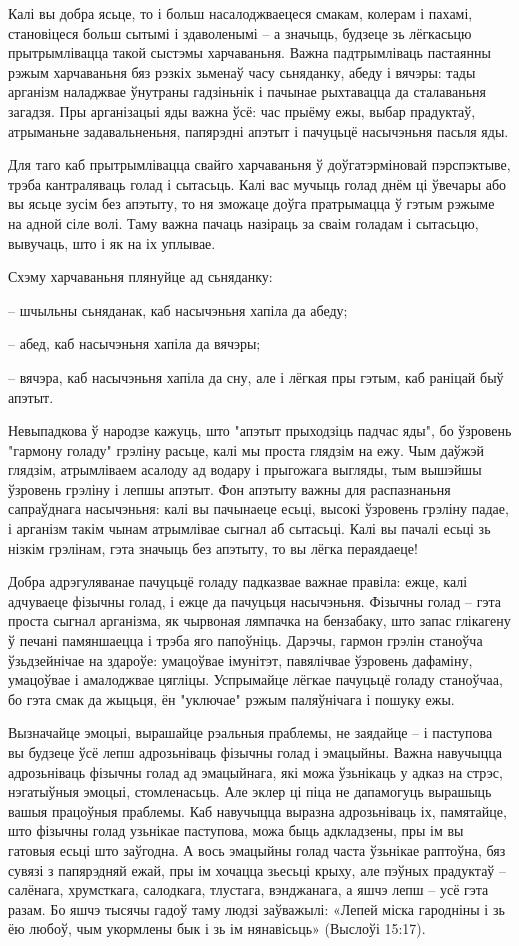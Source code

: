 Калі вы добра ясьце, то і больш насалоджваецеся смакам, колерам і пахамі, становіцеся больш сытымі і здаволенымі – а значыць, будзеце зь лёгкасьцю прытрымлівацца такой сыстэмы харчаваньня. Важна падтрымліваць пастаянны рэжым харчаваньня бяз рэзкіх зьменаў часу сьняданку, абеду і вячэры: тады арганізм наладжвае ўнутраны гадзіньнік і пачынае рыхтавацца да сталаваньня загадзя. Пры арганізацыі яды важна ўсё: час прыёму ежы, выбар прадуктаў, атрыманьне задавальненьня, папярэдні апэтыт і пачуцьцё насычэньня пасьля яды.

Для таго каб прытрымлівацца свайго харчаваньня ў доўгатэрміновай пэрспэктыве, трэба кантраляваць голад і сытасьць. Калі вас мучыць голад днём ці ўвечары або вы ясьце зусім без апэтыту, то ня зможаце доўга пратрымацца ў гэтым рэжыме на адной сіле волі. Таму важна пачаць назіраць за сваім голадам і сытасьцю, вывучаць, што і як на іх уплывае.

Схэму харчаваньня плянуйце ад сьняданку: 

– шчыльны сьняданак, каб насычэньня хапіла да абеду;

– абед, каб насычэньня хапіла да вячэры;

– вячэра, каб насычэньня хапіла да сну, але і лёгкая пры гэтым, каб раніцай быў апэтыт.

Невыпадкова ў народзе кажуць, што "апэтыт прыходзіць падчас яды", бо ўзровень "гармону голаду" грэліну расьце, калі мы проста глядзім на ежу. Чым даўжэй глядзім, атрымліваем асалоду ад водару і прыгожага выгляды, тым вышэйшы ўзровень грэліну і лепшы апэтыт. Фон апэтыту важны для распазнаньня сапраўднага насычэньня: калі вы пачынаеце есьці, высокі ўзровень грэліну падае, і арганізм такім чынам атрымлівае сыгнал аб сытасьці. Калі вы пачалі есьці зь нізкім грэлінам, гэта значыць без апэтыту, то вы лёгка пераядаеце!

Добра адрэгуляванае пачуцьцё голаду падказвае важнае правіла: ежце, калі адчуваеце фізычны голад, і ежце да пачуцьця насычэньня. Фізычны голад – гэта проста сыгнал арганізма, як чырвоная лямпачка на бензабаку, што запас глікагену ў печані памяншаецца і трэба яго папоўніць. Дарэчы, гармон грэлін станоўча ўзьдзейнічае на здароўе: умацоўвае імунітэт, павялічвае ўзровень дафаміну, умацоўвае і амалоджвае цягліцы. Успрымайце лёгкае пачуцьцё голаду станоўчаа, бо гэта смак да жыцьця, ён "уключае" рэжым паляўнічага і пошуку ежы.

Вызначайце эмоцыі, вырашайце рэальныя праблемы, не заядайце – і паступова вы будзеце ўсё лепш адрозьніваць фізычны голад і эмацыйны. Важна навучыцца адрозьніваць фізычны голад ад эмацыйнага, які можа ўзьнікаць у адказ на стрэс, нэгатыўныя эмоцыі, стомленасьць. Але эклер ці піца не дапамогуць вырашыць вашыя працоўныя праблемы. Каб навучыцца выразна адрозьніваць іх, памятайце, што фізычны голад узьнікае паступова, можа быць адкладзены, пры ім вы гатовыя есьці што заўгодна. А вось эмацыйны голад часта ўзьнікае раптоўна, бяз сувязі з папярэдняй ежай, пры ім хочацца зьесьці крыху, але пэўных прадуктаў – салёнага, хрумсткага, салодкага, тлустага, вэнджанага, а яшчэ лепш – усё гэта разам. Бо яшчэ тысячы гадоў таму людзі заўважылі: «Лепей міска гародніны і зь ёю любоў, чым укормлены бык і зь ім нянавісьць» (Выслоўі 15:17).

